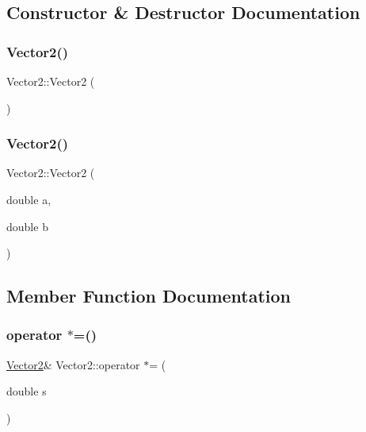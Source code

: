 \subsection{Constructor \& Destructor Documentation}
\mbox{\label{struct_vector2_af1de25cf0004820d5e6db855c91bc4ad}} 
\subsubsection{\texorpdfstring{Vector2()}{Vector2()}\hspace{0.1cm}{\footnotesize\ttfamily [1/2]}}
{\footnotesize\ttfamily Vector2\+::\+Vector2 (\begin{DoxyParamCaption}{ }\end{DoxyParamCaption})\hspace{0.3cm}{\ttfamily [default]}}

\mbox{\label{struct_vector2_a3df68e1e1f4e6415c8d0839ed12e7d00}} 
\subsubsection{\texorpdfstring{Vector2()}{Vector2()}\hspace{0.1cm}{\footnotesize\ttfamily [2/2]}}
{\footnotesize\ttfamily Vector2\+::\+Vector2 (\begin{DoxyParamCaption}\item[{double}]{a,  }\item[{double}]{b }\end{DoxyParamCaption})\hspace{0.3cm}{\ttfamily [inline]}}



\subsection{Member Function Documentation}
\mbox{\label{struct_vector2_a2686aed24066cab2940438ca54032acf}} 
\subsubsection{\texorpdfstring{operator $\ast$=()}{operator *=()}}
{\footnotesize\ttfamily \mbox{\hyperlink{struct_vector2}{Vector2}}\& Vector2\+::operator $\ast$= (\begin{DoxyParamCaption}\item[{double}]{s }\end{DoxyParamCaption})\hspace{0.3cm}{\ttfamily [inline]}}


